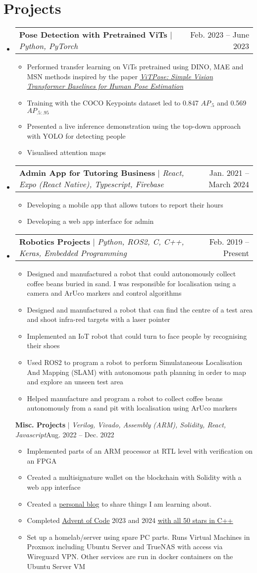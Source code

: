 \documentclass[letterpaper,11pt]{article}
\makeatletter
\newcommand{\resumeItem}[1]{
  \item\small{
    {#1 \vspace{-2pt}}
  }
}
\newcommand{\resumeProjectHeading}[2]{
  \item
  \begin{tabular*}{0.97\textwidth}{l@{\extracolsep{\fill}}r}
    \small#1 & #2 \\
  \end{tabular*}\vspace{-7pt}
}
\newcommand{\resumeSubHeadingListStart}{\begin{itemize}[leftmargin=0.15in, label={}]}
\newcommand{\resumeSubHeadingListEnd}{\end{itemize}}
\newcommand{\resumeItemListStart}{\begin{itemize}}
\newcommand{\resumeItemListEnd}{\end{itemize}\vspace{-5pt}}
\makeatother
\begin{document}
\section{Projects}
\resumeSubHeadingListStart
\resumeProjectHeading
{\textbf{Pose Detection with Pretrained ViTs} $|$ \emph{Python, PyTorch}}{Feb. 2023 -- June 2023}
\resumeItemListStart
\resumeItem{Performed transfer learning on ViTs pretrained using DINO, MAE and MSN methods inspired by the paper \href{https://doi.org/10.48550/arXiv.2204.12484}{\ul{\textit{ViTPose: Simple Vision Transformer Baselines for Human Pose Estimation}}}}
\resumeItem{Training with the COCO Keypoints dataset led to 0.847 $AP_{.5}$ and
  0.569 $AP_{.5:.95}$}
\resumeItem{Presented a live inference demonstration using the top-down approach with YOLO
  for detecting people}
\resumeItem{Visualised attention maps}
\resumeItemListEnd
\resumeProjectHeading
{\textbf{Admin App for Tutoring Business} $|$ \emph{React, Expo (React Native), Typescript, Firebase}}{Jan. 2021 -- March 2024}
\resumeItemListStart
\resumeItem{Developing a mobile app that allows tutors to report their hours}
\resumeItem{Developing a web app interface for admin}
\resumeItemListEnd
\resumeProjectHeading
{\textbf{Robotics Projects} $|$ \emph{Python, ROS2, C, C++, Keras, Embedded Programming}}{Feb. 2019 -- Present}
\resumeItemListStart
\resumeItem{Designed and manufactured a robot that could autonomously collect coffee beans
  buried in sand. I was responsible for localisation using a camera and ArUco
  markers and control algorithms}
\resumeItem{Designed and manufactured a robot that can find the centre of a test area and
  shoot infra-red targets with a laser pointer}
\resumeItem{Implemented an IoT robot that could turn to face people by recognising their
  shoes}
\resumeItem{Used ROS2 to program a robot to perform Simulataneous Localisation And Mapping
  (SLAM) with autonomous path planning in order to map and explore an unseen test
  area}
\resumeItem{Helped manufacture and program a robot to collect coffee beans autonomously
  from a sand pit with localisation using ArUco markers}
\resumeItemListEnd
{\textbf{Misc. Projects} $|$ \emph{Verilog, Vivado, Assembly (ARM), Solidity, React, Javascript}}{Aug. 2022 -- Dec. 2022}
\resumeItemListStart
\resumeItem{Implemented parts of an ARM processor at RTL level with verification on an FPGA}
\resumeItem{Created a multisignature wallet on the blockchain with Solidity with a web app
  interface}
\resumeItem{Created a \href{https://tariqs.com.au/}{\ul{personal blog}} to share things I am learning about.}
\resumeItem{Completed \href{https://adventofcode.com/}{\ul{Advent of Code}} 2023 and 2024 \href{https://github.com/TSoli/advent-of-code}{\ul{with all 50 stars in C++}}}
\resumeItem{Set up a homelab/server using spare PC parts. Runs Virtual Machines in Proxmox
  including Ubuntu Server and TrueNAS with access via Wireguard VPN. Other
  services are run in docker containers on the Ubuntu Server VM}
\resumeItemListEnd
\resumeSubHeadingListEnd
\end{document}
